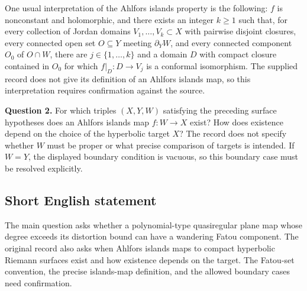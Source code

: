 \documentclass[11pt]{article}
\begin{document}
One usual interpretation of the Ahlfors islands property is the following: \(f\) is nonconstant and holomorphic, and there exists an integer \(k\geq1\) such that, for every collection of Jordan domains \(V_1,\ldots,V_k\subset X\) with pairwise disjoint closures, every connected open set \(O\subseteq Y\) meeting \(\partial_Y W\), and every connected component \(O_0\) of \(O\cap W\), there are \(j\in\{1,\ldots,k\}\) and a domain \(D\) with compact closure contained in \(O_0\) for which \(f|_D\colon D\to V_j\) is a conformal isomorphism. The supplied record does not give its definition of an Ahlfors islands map, so this interpretation requires confirmation against the source.

\textbf{Question 2.} For which triples \((X,Y,W)\) satisfying the preceding surface hypotheses does an Ahlfors islands map \(f\colon W\to X\) exist? How does existence depend on the choice of the hyperbolic target \(X\)? The record does not specify whether \(W\) must be proper or what precise comparison of targets is intended. If \(W=Y\), the displayed boundary condition is vacuous, so this boundary case must be resolved explicitly.
\subsection{Short English statement}
The main question asks whether a polynomial-type quasiregular plane map whose degree exceeds its distortion bound can have a wandering Fatou component. The original record also asks when Ahlfors islands maps to compact hyperbolic Riemann surfaces exist and how existence depends on the target. The Fatou-set convention, the precise islands-map definition, and the allowed boundary cases need confirmation.
\end{document}
